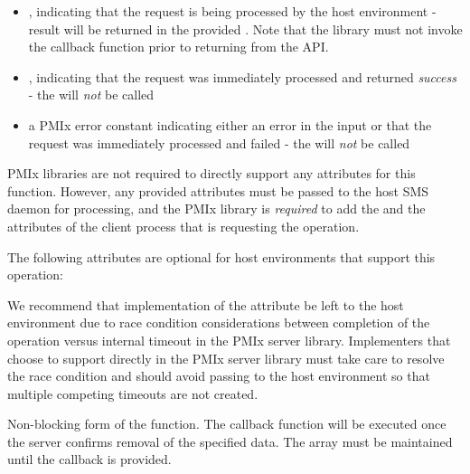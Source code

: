 \begin{itemize}
    \item {}, indicating that the request is being processed by the host environment - result will be returned in the provided . Note that the library must not invoke the callback function prior to returning from the \ac{API}.
    \item {}, indicating that the request was immediately processed and returned \textit{success} - the  will \textit{not} be called
    \item a PMIx error constant indicating either an error in the input or that the request was immediately processed and failed - the  will \textit{not} be called
\end{itemize}

\reqattrstart
\ac{PMIx} libraries are not required to directly support any attributes for this function. However, any provided attributes must be passed to the host \ac{SMS} daemon for processing, and the \ac{PMIx} library is \textit{required} to add the  and the  attributes of the client process that is requesting the operation.

\reqattrend

\optattrstart
The following attributes are optional for host environments that support this operation:


\optattrend

\adviceimplstart
We recommend that implementation of the  attribute be left to the host environment due to race condition considerations between completion of the operation versus internal timeout in the \ac{PMIx} server library. Implementers that choose to support  directly in the \ac{PMIx} server library must take care to resolve the race condition and should avoid passing  to the host environment so that multiple competing timeouts are not created.
\adviceimplend

\descr

Non-blocking form of the  function.
The callback function will be executed once the server confirms removal of the specified data. The  array must be maintained until the callback is provided.



